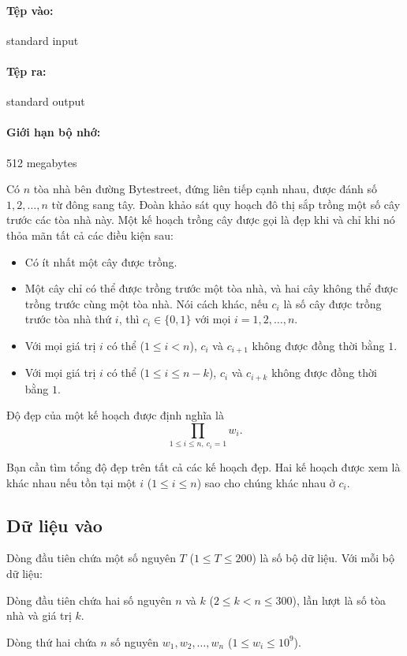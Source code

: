 \documentclass[11pt]{article}
\begin{document}
\paragraph{Tệp vào:} standard input
\paragraph{Tệp ra:} standard output
\paragraph{Giới hạn bộ nhớ:} 512 megabytes

Có \(n\) tòa nhà bên đường Bytestreet, đứng liên tiếp cạnh nhau, được đánh số
\(1,2,\ldots,n\) từ đông sang tây. Đoàn khảo sát quy hoạch đô thị sắp trồng
một số cây trước các tòa nhà này. Một kế hoạch trồng cây được gọi là đẹp khi
và chỉ khi nó thỏa mãn tất cả các điều kiện sau:
\begin{itemize}
  \item Có ít nhất một cây được trồng.
  \item Một cây chỉ có thể được trồng trước một tòa nhà, và hai cây không thể
  được trồng trước cùng một tòa nhà. Nói cách khác, nếu \(c_i\) là số cây
  được trồng trước tòa nhà thứ \(i\), thì \(c_i\in\{0,1\}\) với mọi
  \(i=1,2,\ldots,n\).
  \item Với mọi giá trị \(i\) có thể (\(1\le i<n\)), \(c_i\) và \(c_{i+1}\)
  không được đồng thời bằng \(1\).
  \item Với mọi giá trị \(i\) có thể (\(1\le i\le n-k\)), \(c_i\) và
  \(c_{i+k}\) không được đồng thời bằng \(1\).
\end{itemize}

Độ đẹp của một kế hoạch được định nghĩa là
\[
  \prod_{1\le i\le n,\ c_i=1} w_i.
\]

Bạn cần tìm tổng độ đẹp trên tất cả các kế hoạch đẹp. Hai kế hoạch được xem
là khác nhau nếu tồn tại một \(i\) (\(1\le i\le n\)) sao cho chúng khác nhau
ở \(c_i\).

\subsection*{Dữ liệu vào}

Dòng đầu tiên chứa một số nguyên \(T\) (\(1\le T\le 200\)) là số bộ dữ liệu.
Với mỗi bộ dữ liệu:

Dòng đầu tiên chứa hai số nguyên \(n\) và \(k\)
(\(2\le k<n\le 300\)), lần lượt là số tòa nhà và giá trị \(k\).

Dòng thứ hai chứa \(n\) số nguyên \(w_1,w_2,\ldots,w_n\)
(\(1\le w_i\le 10^9\)).
\end{document}
